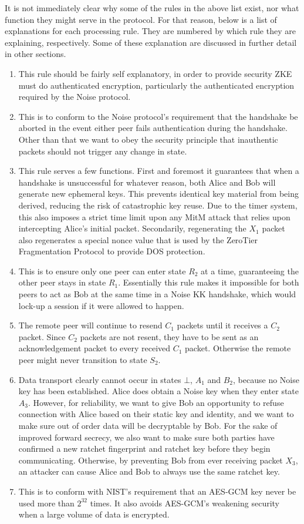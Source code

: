 \documentclass{article}
\begin{document}
It is not immediately clear why some of the rules in the above list exist, nor what function they might serve in the protocol. For that reason, below is a list of explanations for each processing rule. They are numbered by which rule they are explaining, respectively. Some of these explanation are discussed in further detail in other sections.
\begin{enumerate}
	\item This rule should be fairly self explanatory, in order to provide security ZKE must do authenticated encryption, particularly the authenticated encryption required by the Noise protocol.
	\item This is to conform to the Noise protocol's requirement that the handshake be aborted in the event either peer fails authentication during the handshake. Other than that we want to obey the security principle that inauthentic packets should not trigger any change in state.
	\item  This rule serves a few functions. First and foremost it guarantees that when a handshake is unsuccessful for whatever reason, both Alice and Bob will generate new ephemeral keys. This prevents identical key material from being derived, reducing the risk of catastrophic key reuse. Due to the timer system, this also imposes a strict time limit upon any MitM attack that relies upon intercepting Alice's initial packet. Secondarily, regenerating the $X_1$ packet also regenerates a special nonce value that is used by the ZeroTier Fragmentation Protocol to provide DOS protection.
	\item This is to ensure only one peer can enter state $R_2$ at a time, guaranteeing the other peer stays in state $R_1$. Essentially this rule makes it impossible for both peers to act as Bob at the same time in a Noise KK handshake, which would lock-up a session if it were allowed to happen.
	\item The remote peer will continue to resend $C_1$ packets until it receives a $C_2$ packet. Since $C_2$ packets are not resent, they have to be sent as an acknowledgement packet to every received $C_1$ packet. Otherwise the remote peer might never transition to state $S_2$.
	\item Data transport clearly cannot occur in states $\bot$, $A_1$ and $B_2$, because no Noise key has been established. Alice does obtain a Noise key when they enter state $A_3$. However, for reliability, we want to give Bob an opportunity to refuse connection with Alice based on their static key and identity, and we want to make sure out of order data will be decryptable by Bob. For the sake of improved forward secrecy, we also want to make sure both parties have confirmed a new ratchet fingerprint and ratchet key before they begin communicating. Otherwise, by preventing Bob from ever receiving packet $X_3$, an attacker can cause Alice and Bob to always use the same ratchet key.
	\item This is to conform with NIST's requirement that an AES-GCM key never be used more than $2^{32}$ times. It also avoids AES-GCM's weakening security when a large volume of data is encrypted.
\end{enumerate}
\end{document}
